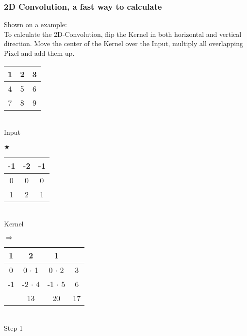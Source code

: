 \subsubsection{2D Convolution, a fast way to calculate}
Shown on a example: \\
To calculate the 2D-Convolution, flip the Kernel in both horizontal and vertical direction. Move the center of the Kernel over the Input, multiply all overlapping Pixel and add them up.\\
	\begin{minipage}{2.1cm}
		\begin{tabular}{|c|c|c|} \hline
			1 & 2 & 3 \\ \hline
	      	4 & 5 & 6 \\ \hline
	      	7 & 8 & 9 \\ \hline
	      \end{tabular}
	      \\ Input
	\end{minipage}
	\begin{minipage}{0.3cm}
		$\bigstar$
	\end{minipage}
	\begin{minipage}{2.5cm}
		\begin{tabular}{|c|c|c|} \hline
			\rowcolor{lightgray} -1 & -2 & -1 \\ \hline
	      	\cellcolor{lightgray} 0 & \cellcolor{gray} 0 & \cellcolor{lightgray} 0 \\ \hline
	      	\rowcolor{lightgray} 1 & 2 & 1 \\ \hline
	      \end{tabular}
	      \\Kernel
	\end{minipage}
	\begin{minipage}{0.3cm}
			$\Rightarrow$
		\end{minipage}
	\begin{minipage}{5cm}
		\begin{tabular}{|c|c|c|c|} \hline
			\cellcolor{lightgray} 1 & \cellcolor{lightgray} 2& \cellcolor{lightgray} 1 &  \\ \hline
		 	\cellcolor{lightgray} 0 & \cellcolor{gray} 0 $\cdot$ 1 & \cellcolor{lightgray} 0 $\cdot$ 2 & 3 \\ \hline
	      	 \cellcolor{lightgray} -1 & \cellcolor{lightgray} -2 $\cdot$ 4 & \cellcolor{lightgray} -1 $\cdot$ 5 & 6\\ \hline
	      	 & 13 & 20 & 17 \\ \hline
	      \end{tabular}
	      \\Step 1
	\end{minipage}
